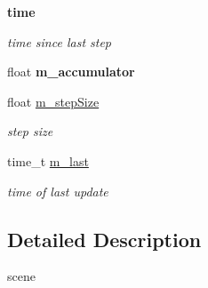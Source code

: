 \begin{Indent}{\bf time}\par
{\em \label{_amgrp07cc694b9b3fc636710fa08b6922c42b}
 time since last step }\begin{DoxyCompactItemize}
\item 
\hypertarget{classContent_1_1CO__SC__AD__Scene_a4a227a73c6b2dfb2b784bfe416c58e2b}{
float {\bfseries m\_\-accumulator}}
\label{classContent_1_1CO__SC__AD__Scene_a4a227a73c6b2dfb2b784bfe416c58e2b}

\item 
\hypertarget{classContent_1_1CO__SC__AD__Scene_a753d1fe921025db6d1e0adb9dceee8bf}{
float \hyperlink{classContent_1_1CO__SC__AD__Scene_a753d1fe921025db6d1e0adb9dceee8bf}{m\_\-stepSize}}
\label{classContent_1_1CO__SC__AD__Scene_a753d1fe921025db6d1e0adb9dceee8bf}

\begin{DoxyCompactList}\small\item\em step size \item\end{DoxyCompactList}\item 
\hypertarget{classContent_1_1CO__SC__AD__Scene_a79dac15336c8dca661753918ccecca8f}{
time\_\-t \hyperlink{classContent_1_1CO__SC__AD__Scene_a79dac15336c8dca661753918ccecca8f}{m\_\-last}}
\label{classContent_1_1CO__SC__AD__Scene_a79dac15336c8dca661753918ccecca8f}

\begin{DoxyCompactList}\small\item\em time of last update \item\end{DoxyCompactList}\end{DoxyCompactItemize}
\end{Indent}


\subsection{Detailed Description}
scene 

